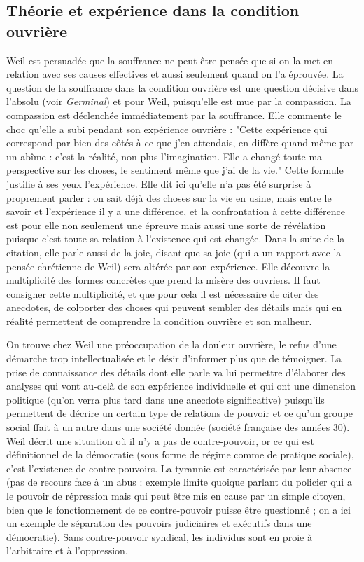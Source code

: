 \documentclass[a4paper,12pt]{book}
\begin{document}
\subsection{Théorie et expérience dans la condition ouvrière}
Weil est persuadée que la souffrance ne peut être pensée que si on la met en relation avec ses causes effectives et aussi seulement quand on l'a éprouvée. La question de la souffrance dans la condition ouvrière est une question décisive dans l'absolu (voir \textit{Germinal}) et pour Weil, puisqu'elle est mue par la compassion. La compassion est déclenchée immédiatement par la souffrance. Elle commente le choc qu'elle a subi pendant son expérience ouvrière : "Cette expérience qui correspond par bien des côtés à ce que j'en attendais, en diffère quand même par un abîme : c'est la réalité, non plus l'imagination. Elle a changé toute ma perspective sur les choses, le sentiment même que j'ai de la vie." Cette formule justifie à ses yeux l'expérience. Elle dit ici qu'elle n'a pas été surprise à proprement parler : on sait déjà des choses sur la vie en usine, mais entre le savoir et l'expérience il y a une différence, et la confrontation à cette différence est pour elle non seulement une épreuve mais aussi une sorte de révélation puisque c'est toute sa relation à l'existence qui est changée. Dans la suite de la citation, elle parle aussi de la joie, disant que sa joie (qui a un rapport avec la pensée chrétienne de Weil) sera altérée par son expérience. Elle découvre la multiplicité des formes concrètes que prend la misère des ouvriers. Il faut consigner cette multiplicité, et que pour cela il est nécessaire de citer des anecdotes, de colporter des choses qui peuvent sembler des détails mais qui en réalité permettent de comprendre la condition ouvrière et son malheur.
\par On trouve chez Weil une préoccupation de la douleur ouvrière, le refus d'une démarche trop intellectualisée et le désir d'informer plus que de témoigner. La prise de connaissance des détails dont elle parle va lui permettre d'élaborer des analyses qui vont au-delà de son expérience individuelle et qui ont une dimension politique (qu'on verra plus tard dans une anecdote significative) puisqu'ils permettent de décrire un certain type de relations de pouvoir et ce qu'un groupe social ffait à un autre dans une société donnée (société française des années 30). Weil décrit une situation où il n'y a pas de contre-pouvoir, or ce qui est définitionnel de la démocratie (sous forme de régime comme de pratique sociale), c'est l'existence de contre-pouvoirs. La tyrannie est caractérisée par leur absence (pas de recours face à un abus : exemple limite quoique parlant du policier qui a le pouvoir de répression mais qui peut être mis en cause par un simple citoyen, bien que le fonctionnement de ce contre-pouvoir puisse être questionné ; on a ici un exemple de séparation des pouvoirs judiciaires et exécutifs dans une démocratie). Sans contre-pouvoir syndical, les individus sont en proie à l'arbitraire et à l'oppression.
\end{document}
